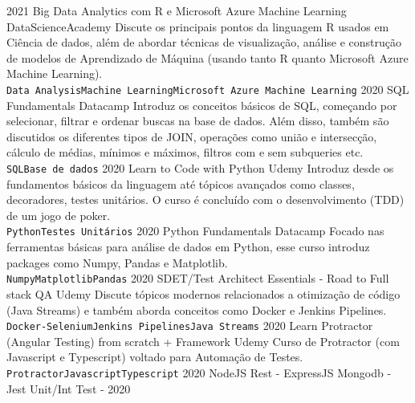 \documentclass[9pt]{developercv} %
\begin{document}
\begin{entrylist}
	\entry
		{2021}%
		{Big Data Analytics com R e Microsoft Azure Machine Learning}
		{DataScienceAcademy}
		{Discute os principais pontos da linguagem R usados em Ciência de dados, além de abordar técnicas de visualização, análise e construção de modelos de Aprendizado de Máquina (usando tanto R quanto Microsoft Azure Machine Learning).\\ 
		\texttt{Data Analysis}\slashsep\texttt{Machine Learning}\slashsep\texttt{Microsoft Azure Machine Learning}}
	\entry
		{2020}%
		{SQL Fundamentals}
		{Datacamp}
		{Introduz os conceitos básicos de SQL, começando por selecionar, filtrar e ordenar buscas na base de dados. Além disso, também são discutidos os diferentes tipos de JOIN, operações como união e intersecção, cálculo de médias, mínimos e máximos, filtros com e sem subqueries etc.\\ 
		\texttt{SQL}\slashsep\texttt{Base de dados}}
	\entry
		{2020}
		{Learn to Code with Python}
		{Udemy}
		{Introduz desde os fundamentos básicos da linguagem até tópicos avançados como classes, decoradores, testes unitários. O curso é concluído com o desenvolvimento (TDD) de um jogo de poker.\\ 
		\texttt{Python}\slashsep\texttt{Testes Unitários}}
	\entry
		{2020}%
		{Python Fundamentals}
		{Datacamp}
		{Focado nas ferramentas básicas para análise de dados em Python, esse curso introduz packages como Numpy, Pandas e Matplotlib.\\ 
		\texttt{Numpy}\slashsep\texttt{Matplotlib}\slashsep\texttt{Pandas}}
	\entry
		{2020}
		{SDET/Test Architect Essentials - Road to Full stack QA}
		{Udemy}
		{Discute tópicos modernos relacionados a otimização de código (Java Streams) e também aborda conceitos como Docker e Jenkins Pipelines.\\ 
		\texttt{Docker-Selenium}\slashsep\texttt{Jenkins Pipelines}\slashsep\texttt{Java Streams}}
	\entry
		{2020}
		{Learn Protractor (Angular Testing) from scratch + Framework}
		{Udemy}
		{Curso de Protractor (com Javascript e Typescript) voltado para Automação de Testes.\\ \texttt{Protractor}\slashsep\texttt{Javascript}\slashsep\texttt{Typescript}}
	\entry
		{2020}%
		{NodeJS Rest - ExpressJS Mongodb - Jest Unit/Int Test - 2020}

\end{entrylist}
\end{document}
